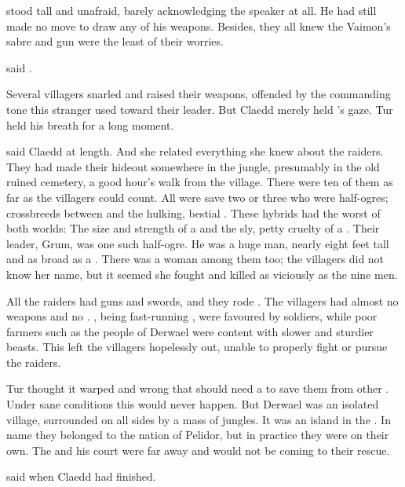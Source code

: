 \Shachar stood tall and unafraid, barely acknowledging the speaker at all. 
He had still made no move to draw any of his weapons. 
Besides, they all knew the Vaimon's sabre and gun were the least of their worries.

 said \Shachar. 

Several villagers snarled and raised their weapons, offended by the commanding tone this stranger used toward their leader. 
But Claedd merely held \Shachar's gaze. 
Tur held his breath for a long moment. 

 said Claedd at length.
And she related everything she knew about the raiders. 
They had made their hideout somewhere in the jungle, presumably in the old ruined cemetery, a good hour's walk from the village. 
There were ten of them as far as the villagers could count. 
All were \human save two or three who were half-ogres; crossbreeds between \humans and the hulking, bestial \nephilim. 
These hybrids had the worst of both worlds: 
The size and strength of a \nephil and the sly, petty cruelty of a \human.
Their leader, Grum, was one such half-ogre. 
He was a huge man, nearly eight feet tall and as broad as a \muroc. 
There was a woman among them too; the villagers did not know her name, but it seemed she fought and killed as viciously as the nine men. 

All the raiders had guns and swords, and they rode \relcs. 
The villagers had almost no weapons and no \relcs. 
\Relcs, being fast-running \saurians, were favoured by soldiers, while poor farmers such as the people of Derwael were content with slower and sturdier beasts. 
This left the villagers hopelessly out\manoeuvred, unable to properly fight or pursue the raiders.

Tur thought it warped and wrong that \scathae should need a \human to save them from other \humans. 
Under sane conditions this would never happen. 
But Derwael was an isolated village, surrounded on all sides by a mass of jungles. 
It was an island in the \wylde. 
In name they belonged to the nation of Pelidor, but in practice they were on their own. 
The \rayuth and his court were far away and would not be coming to their rescue. 

 said \CarzainShireyo when Claedd had finished.



